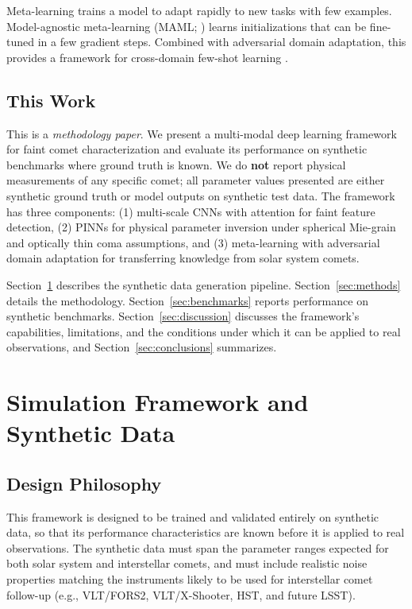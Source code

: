 \documentclass[preprint2]{aastex631}
\begin{document}
Meta-learning trains a model to adapt rapidly to new tasks with few examples. Model-agnostic meta-learning (MAML; \citealt{finn17}) learns initializations that can be fine-tuned in a few gradient steps. Combined with adversarial domain adaptation, this provides a framework for cross-domain few-shot learning \citep{li18}.

\subsection{This Work}

This is a \textit{methodology paper}. We present a multi-modal deep learning framework for faint comet characterization and evaluate its performance on synthetic benchmarks where ground truth is known. We do \textbf{not} report physical measurements of any specific comet; all parameter values presented are either synthetic ground truth or model outputs on synthetic test data. The framework has three components: (1) multi-scale CNNs with attention for faint feature detection, (2) PINNs for physical parameter inversion under spherical Mie-grain and optically thin coma assumptions, and (3) meta-learning with adversarial domain adaptation for transferring knowledge from solar system comets.

Section~\ref{sec:simulation} describes the synthetic data generation pipeline. Section~\ref{sec:methods} details the methodology. Section~\ref{sec:benchmarks} reports performance on synthetic benchmarks. Section~\ref{sec:discussion} discusses the framework's capabilities, limitations, and the conditions under which it can be applied to real observations, and Section~\ref{sec:conclusions} summarizes.

\section{Simulation Framework and Synthetic Data}\label{sec:simulation}

\subsection{Design Philosophy}

This framework is designed to be trained and validated entirely on synthetic data, so that its performance characteristics are known before it is applied to real observations. The synthetic data must span the parameter ranges expected for both solar system and interstellar comets, and must include realistic noise properties matching the instruments likely to be used for interstellar comet follow-up (e.g., VLT/FORS2, VLT/X-Shooter, HST, and future LSST).
\end{document}
